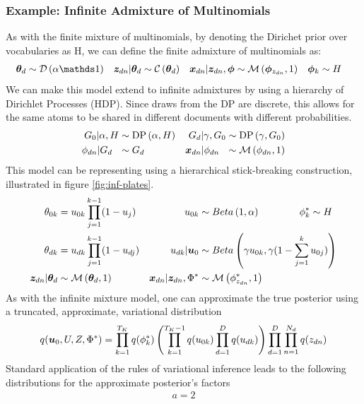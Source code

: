 \subsubsection*{Example: Infinite Admixture of Multinomials}
As with the finite mixture of multinomials, by denoting the Dirichet prior over vocabularies as H, we can define the finite admixture of multinomials as:
\begin{align}
\thd & \sim \dir{\alpha \one} &
\zdn|\thd & \sim \cat{\thd} & 
\xdn|\zdn, \param & \sim \muln{\param_{z_{dn}}}{1} & 
\param_k & \sim H
\end{align}
We can make this model extend to infinite admixtures by using a hierarchy of Dirichlet Processes (HDP)\cite{Teh2006b}. Since draws from the DP are discrete, this allows for the same atoms to be shared in different documents with different probabilities.
\begin{align}
G_0|\alpha, H & \sim \text{DP} \left( {\alpha, H} \right) &
G_d|\gamma, G_0 & \sim \text{DP} \left( {\gamma, G_0} \right) \\
\phi_{dn}|G_d\text{ }\text{ } &\sim G_d &
{ \bm x_{dn} }|\phi_{dn}\text{ }\text{ } & \sim \mathcal{M} \left( {\phi_{dn}},{1} \right)
\end{align}
This model can be representing using a hierarchical stick-breaking construction, illustrated in figure \ref{fig:inf-plates}.
\begin{align}
\theta_{0k} & = u_{0k} \prod_{j=1}^{k-1}(1-u_j) &
u_{0k} & \sim Beta \left( {1}, {\alpha} \right) \qquad\qquad
\phi^*_k \sim H \\
\theta_{dk} &= u_{dk} \prod_{j=1}^{k-1}(1 - u_{dj}) &
u_{dk}|\bm u_{0} & \sim Beta \left( {\gamma u_{0k}}, {\gamma ( 1 - \sum_{j=1}^{k} u_{0j} )} \right) \\
{ \bm z_{dn} } | { \bm \theta_d } & \sim \mathcal{M} \left( {{ \bm \theta_d }},{1} \right) &
{ \bm x_{dn} } | { \bm z_{dn} }, \Phi^* &\sim \mathcal{M} \left( {\phi^*_{z_{dn}}},{1} \right)
\end{align}
As with the infinite mixture model, one can approximate the true posterior using a truncated, approximate, variational distribution
\begin{equation}
q(\bm u_0, U, Z, \Phi^*) = \prod_{k=1}^{T_K} q(\phi^*_k) \left( \prod_{k=1}^{T_K-1} q(u_{0k}) \prod_{d=1}^D q(u_{dk})\right) \prod_{d=1}^{D}\prod_{n=1}^{N_d} q(z_{dn})
\end{equation}
Standard application of the rules of variational inference leads to the following distributions for the approximate posterior's factors
\begin{align}
a = 2
\end{align}


